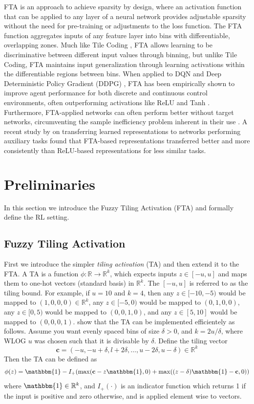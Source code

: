 \documentclass{article}
\newcommand{\RR}{\mathbb{R}}
\begin{document}
FTA is an approach to achieve sparsity by design, 
where an activation function that can be applied to any layer of a neural network provides adjustable sparsity without the need for pre-training or adjustments to the loss function. 
The FTA function aggregates inputs of any feature layer into bins with differentiable, overlapping zones. Much like Tile Coding \cite[]{tilecoding}, 
FTA allows learning to be discriminative between different input values through binning, but unlike Tile Coding, 
FTA maintains input generalization through learning activations within the differentiable regions between bins. 
When applied to DQN and Deep Deterministic Policy Gradient (DDPG) \cite[]{ddpg}, 
FTA has been empirically shown to improve agent performance for both discrete and continuous control environments, 
often outperforming activations like ReLU and Tanh \cite[]{pan2019fuzzy}. Furthermore, FTA-applied networks can often perform better without target networks, 
circumventing the sample inefficiency problem inherent in their use \cite[]{pan2019fuzzy}. 
A recent study by \cite{nnrep} on transferring learned representations to networks performing auxiliary tasks found that FTA-based representations 
transferred better and more consistently than ReLU-based representations for less similar tasks.

\section{Preliminaries} \label{sec:prelims}
In this section we introduce the Fuzzy Tiling Activation (FTA) and formally define the RL setting.

\subsection{Fuzzy Tiling Activation}
First we introduce the simpler \textit{tiling activation} (TA) and then extend it to the FTA.
A TA is a function $\phi: \RR \to \RR^k$, which expects inputs $z \in [-u, u]$ and maps them to one-hot vectors (standard basis) in $\RR^k$.
The $[-u, u]$ is referred to as the tiling bound.
For example, if $u=10$ and $k=4$, then any $z \in [-10,-5)$ would be mapped to $(1, 0 ,0, 0) \in \RR^k$, any $z \in [-5, 0)$ would be mapped to $(0, 1, 0, 0)$, any $z \in [0, 5)$ would be mapped to $(0, 0, 1, 0)$, and any $z \in [5, 10]$ would be mapped to $(0, 0, 0, 1)$.
\cite{pan2019fuzzy} show that the TA can be implemented efficientely as follows.
Assume you want evenly spaced bins of size $\delta > 0$, and $k = 2 u/ \delta$, where WLOG $u$ was chosen such that it is divisable by $\delta$. 
Define the tiling vector 
$$\mathbf{c} = (-u, -u + \delta, l + 2 \delta, \dots, u - 2 \delta, u - \delta) \in \RR^k$$
Then the TA can be defined as
$$\phi(z) = \mathbbm{1} - I_+(\max(\mathbf{c} - z\mathbbm{1}, 0) + \max((z -\delta)\mathbbm{1} - \mathbf{c}, 0))$$
where $\mathbbm{1} \in \RR^k$, and $I_+(\cdot)$ is an indicator function which returns 1 if the input is positive and zero otherwise, and is applied element wise to vectors.
\end{document}

